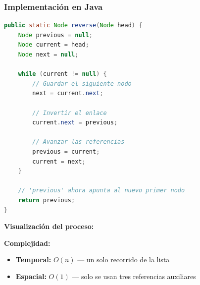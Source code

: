 \documentclass[12pt]{article}
\begin{document}
\newpage
\subsubsection*{Implementación en Java}

\begin{lstlisting}[style=estilo_base, language=Java]
public static Node reverse(Node head) {
    Node previous = null;
    Node current = head;
    Node next = null;
    
    while (current != null) {
        // Guardar el siguiente nodo
        next = current.next;
        
        // Invertir el enlace
        current.next = previous;
        
        // Avanzar las referencias
        previous = current;
        current = next;
    }
    
    // 'previous' ahora apunta al nuevo primer nodo
    return previous;
}
\end{lstlisting}

\textbf{Visualización del proceso:}

\begin{center}
\end{center}

\textbf{Complejidad:}
\begin{itemize}
    \item \textbf{Temporal:} $O(n)$ --- un solo recorrido de la lista
    \item \textbf{Espacial:} $O(1)$ --- solo se usan tres referencias auxiliares
\end{itemize}
\end{document}
